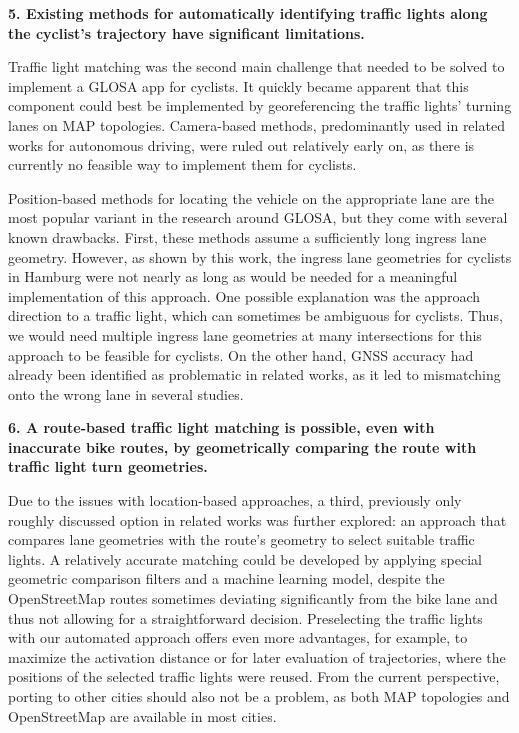\textbf{\color{cidarkblue}5. Existing methods for automatically identifying traffic lights along the cyclist's trajectory have significant limitations.} 

Traffic light matching was the second main challenge that needed to be solved to implement a GLOSA app for cyclists. It quickly became apparent that this component could best be implemented by georeferencing the traffic lights' turning lanes on MAP topologies. Camera-based methods, predominantly used in related works for autonomous driving, were ruled out relatively early on, as there is currently no feasible way to implement them for cyclists. 

Position-based methods for locating the vehicle on the appropriate lane are the most popular variant in the research around GLOSA, but they come with several known drawbacks. First, these methods assume a sufficiently long ingress lane geometry. However, as shown by this work, the ingress lane geometries for cyclists in Hamburg were not nearly as long as would be needed for a meaningful implementation of this approach. One possible explanation was the approach direction to a traffic light, which can sometimes be ambiguous for cyclists. Thus, we would need multiple ingress lane geometries at many intersections for this approach to be feasible for cyclists. On the other hand, GNSS accuracy had already been identified as problematic in related works, as it led to mismatching onto the wrong lane in several studies.

\textbf{\color{cidarkblue}6. A route-based traffic light matching is possible, even with inaccurate bike routes, by geometrically comparing the route with traffic light turn geometries.}

Due to the issues with location-based approaches, a third, previously only roughly discussed option in related works was further explored: an approach that compares lane geometries with the route's geometry to select suitable traffic lights. A relatively accurate matching could be developed by applying special geometric comparison filters and a machine learning model, despite the OpenStreetMap routes sometimes deviating significantly from the bike lane and thus not allowing for a straightforward decision. Preselecting the traffic lights with our automated approach offers even more advantages, for example, to maximize the activation distance or for later evaluation of trajectories, where the positions of the selected traffic lights were reused. From the current perspective, porting to other cities should also not be a problem, as both MAP topologies and OpenStreetMap are available in most cities. 

